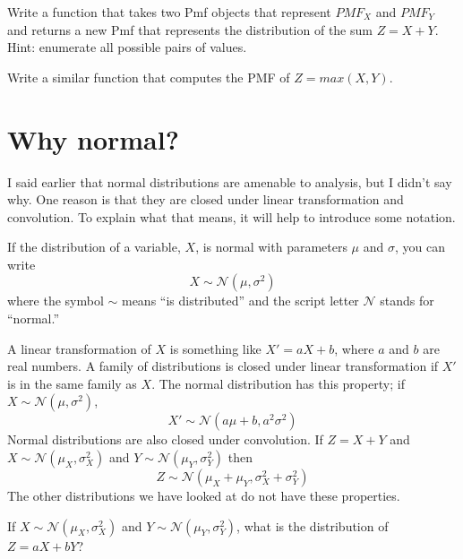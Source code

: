 \documentclass[12pt]{book}
\begin{document}
\begin{ex}

Write a function that takes two Pmf objects that represent $PMF_X$ and
$PMF_Y$ and returns a new Pmf that represents the distribution of
the sum $Z = X+Y$.  Hint: enumerate all possible pairs of values.

Write a similar function that computes the PMF of $Z = max(X,Y)$.

\end{ex}



\section{Why normal?}
\label{why_normal}

\newcommand{\normal}{\mathcal{N}}
\newcommand{\hasdist}{\sim}

I said earlier that normal distributions are amenable to analysis,
but I didn't say why.  One reason is that they are
closed under linear transformation and convolution.  To explain what
that means, it will help to introduce some notation.

If the distribution of a variable, $X$, is
normal with parameters $\mu$ and $\sigma$, you can write
%
\[ X \hasdist \normal (\mu, \sigma^2) \]
%
where the symbol $\hasdist$ means ``is distributed'' and the script letter
$\normal$ stands for ``normal.''


A linear transformation of $X$ is something like $X' = aX + b$, where $a$
and $b$ are real numbers.  A family of distributions is closed under
linear transformation if $X'$ is in the same family as $X$.  The normal
distribution has this property; if $X \hasdist \normal (\mu,
\sigma^2)$,
%
\[ X' \hasdist \normal (a \mu + b, a^2 \sigma^2) \]
%
Normal distributions are also closed under convolution.  
If $Z = X+Y$ and
$X \hasdist \normal (\mu_X, \sigma_X^2)$ and
$Y \hasdist \normal (\mu_Y, \sigma_Y^2)$ then
%
\[ Z \hasdist \normal (\mu_X + \mu_Y, \sigma_X^2 + \sigma_Y^2) \]
%
The other distributions we have looked at do not have these
properties.

\begin{ex}

If 
$X \hasdist \normal (\mu_X, \sigma_X^2)$ and
$Y \hasdist \normal (\mu_Y, \sigma_Y^2)$, what is the distribution
of $Z = aX + bY$?

\end{ex}
\end{document}
